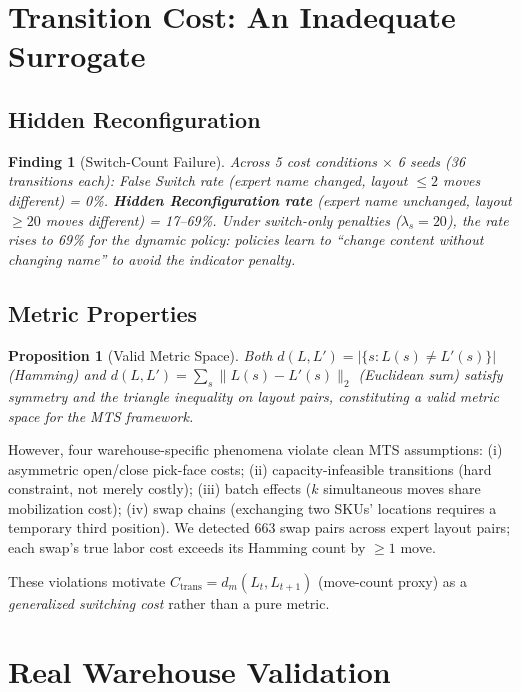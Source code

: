 \documentclass[11pt,a4paper]{article}
\newtheorem{proposition}{Proposition}
\newtheorem{finding}{Finding}
\begin{document}
\section{Transition Cost: An Inadequate Surrogate}\label{sec:transition}

\subsection{Hidden Reconfiguration}

\begin{finding}[Switch-Count Failure]
Across 5 cost conditions $\times$ 6 seeds (36 transitions each):
False Switch rate (expert name changed, layout $\leq 2$ moves different)
= 0\%. \textbf{Hidden Reconfiguration rate} (expert name unchanged,
layout $\geq 20$ moves different) = 17--69\%. Under switch-only penalties
($\lambda_s = 20$), the rate rises to 69\% for the dynamic policy:
policies learn to ``change content without changing name'' to avoid the
indicator penalty.
\end{finding}

\subsection{Metric Properties}

\begin{proposition}[Valid Metric Space]
Both $d(L, L') = |\{s : L(s) \neq L'(s)\}|$ (Hamming) and
$d(L, L') = \sum_s \|L(s) - L'(s)\|_2$ (Euclidean sum) satisfy symmetry
and the triangle inequality on layout pairs, constituting a valid metric
space for the MTS framework.
\end{proposition}

However, four warehouse-specific phenomena violate clean MTS assumptions:
(i) asymmetric open/close pick-face costs; (ii) capacity-infeasible
transitions (hard constraint, not merely costly); (iii) batch effects
($k$ simultaneous moves share mobilization cost); (iv) swap chains
(exchanging two SKUs' locations requires a temporary third position).
We detected 663 swap pairs across expert layout pairs; each swap's true
labor cost exceeds its Hamming count by $\geq 1$ move.

These violations motivate $C_{\text{trans}} = d_m(L_t, L_{t+1})$ (move-count proxy) as a
\emph{generalized switching cost} rather than a pure metric.

\section{Real Warehouse Validation}\label{sec:real}
\end{document}
